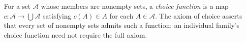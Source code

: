 
For a set $\mathcal A$ whose members are nonempty sets, a \emph{choice function} is a map $c:\mathcal A\to\bigcup\mathcal A$ satisfying $c(A)\in A$ for each $A\in\mathcal A$. The axiom of choice asserts that every set of nonempty sets admits such a function; an individual family's choice function need not require the full axiom.
